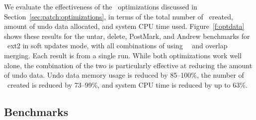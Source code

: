 \opttable{}

We evaluate the effectiveness of the \patch\ optimizations discussed in
Section~\ref{sec:patch:optimizations}, in terms of
%
the total number of \patches\ created, amount of undo data allocated,
and system CPU time used.
%
Figure~\ref{f:optdata} shows these results for the untar, delete,
PostMark, and Andrew benchmarks for \Kudos\ ext2 in soft updates mode,
with all combinations of using \nrb\ \patches\ and overlap merging.
Each result is from a single run.
%
While both optimizations work well alone, the combination of the two
is particularly effective at reducing the amount of undo data.
%
Undo data memory usage is reduced by 85--100\%,
%
the number of \patches\ created is reduced by 73--99\%,
%
and system CPU time is reduced by up to 63\%.
%

\begin{comment}
\begin{figure}[t]
\vspace{-0.5\baselineskip}
\centering{
\texttt{[image: rb\_patch\_size]}
}
\vspace{-0.5\baselineskip}
\caption{\label{fig:patchsize-histo} \Rb\ \patch\ size histogram for a sample
workload (extracting a large archive into ext2). All the \patches\ larger than
63 bytes have been optimized into \nrb\ \patches. \Rb\ \patches\ 4 bytes and
smaller account for about 51\% of all \rb\ \patches.}
\end{figure}
\end{comment}

\subsection {Benchmarks}
\label{sec:eval:bench}

\newcommand{\safe}[1]{\textbf{#1}}
\newcommand{\unsafe}[1]{#1}

